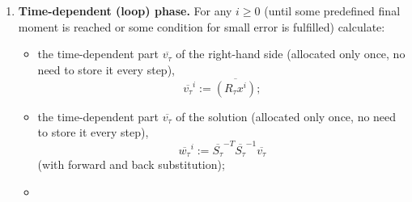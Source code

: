 \begin{algorithm}
\begin{enumerate}
\begin{itemize}
\begin{equation}
            j \in \overline{I};
          \end{equation}
        \item
          the Cholesky decomposition
          \begin{equation}
            \overline{L_\tau} = \overline{S_\tau} \overline{S_\tau}^T,
          \end{equation}
          where $\overline{S_\tau}$ is lower-triangular sparse matrix;
        \item
          the time independent part of the restricted solution
          \begin{equation}
            \overline{z_\tau}
            := \overline{L_\tau}^{-1} \overline{c_\tau}
            = \overline{S_\tau}^{-T} \overline{S_\tau}^{-1} \overline{c_\tau}
          \end{equation}
          (of course, we do not find the inverses of $\overline{S_\tau}$ and its
          transpose but apply forward and back substitution);
        \item
          the initial coordinates $x^0 \in \R^{n_0}$ of the temperature,
          \begin{equation}
            x^0_j := u_0(N_i),\ j = 0, ..., n_0 - 1.
          \end{equation}
      \end{itemize}
    \item
      \textbf{Time-dependent (loop) phase.}
      For any $i \geq 0$ (until some predefined final moment is reached or some
      condition for small error is fulfilled) calculate:
      \begin{itemize}
        \item
          the time-dependent part $\overline{v_\tau}$ of the right-hand side
          (allocated only once, no need to store it every step),
          \begin{equation}
            \overline{v_\tau}^i := \overline{(R_\tau x^i)};
          \end{equation}
        \item
          the time-dependent part $\overline{v_\tau}$ of the solution
          (allocated only once, no need to store it every step),
          \begin{equation}
            \overline{w_\tau}^i :=
            \overline{S_\tau}^{-T} \overline{S_\tau}^{-1} \overline{v_\tau}
          \end{equation}
          (with forward and back substitution);
        \item

\end{itemize}
\end{enumerate}
\end{algorithm}
